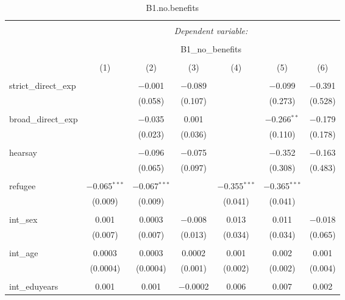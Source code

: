 
\begin{table}[H] \centering 
  \caption{B1.no.benefits} 
  \label{} 
\tiny 
\begin{tabular}{@{\extracolsep{4pt}}lcccccc} 
\\[-1.8ex]\hline 
\hline \\[-1.8ex] 
 & \multicolumn{6}{c}{\textit{Dependent variable:}} \\ 
\cline{2-7} 
\\[-1.8ex] & \multicolumn{6}{c}{B1\_no\_benefits} \\ 
\\[-1.8ex] & (1) & (2) & (3) & (4) & (5) & (6)\\ 
\hline \\[-1.8ex] 
 strict\_direct\_exp &  & $-$0.001 & $-$0.089 &  & $-$0.099 & $-$0.391 \\ 
  &  & (0.058) & (0.107) &  & (0.273) & (0.528) \\ 
  & & & & & & \\ 
 broad\_direct\_exp &  & $-$0.035 & 0.001 &  & $-$0.266$^{**}$ & $-$0.179 \\ 
  &  & (0.023) & (0.036) &  & (0.110) & (0.178) \\ 
  & & & & & & \\ 
 hearsay &  & $-$0.096 & $-$0.075 &  & $-$0.352 & $-$0.163 \\ 
  &  & (0.065) & (0.097) &  & (0.308) & (0.483) \\ 
  & & & & & & \\ 
 refugee & $-$0.065$^{***}$ & $-$0.067$^{***}$ &  & $-$0.355$^{***}$ & $-$0.365$^{***}$ &  \\ 
  & (0.009) & (0.009) &  & (0.041) & (0.041) &  \\ 
  & & & & & & \\ 
 int\_sex & 0.001 & 0.0003 & $-$0.008 & 0.013 & 0.011 & $-$0.018 \\ 
  & (0.007) & (0.007) & (0.013) & (0.034) & (0.034) & (0.065) \\ 
  & & & & & & \\ 
 int\_age & 0.0003 & 0.0003 & 0.0002 & 0.001 & 0.002 & 0.001 \\ 
  & (0.0004) & (0.0004) & (0.001) & (0.002) & (0.002) & (0.004) \\ 
  & & & & & & \\ 
 int\_eduyears & 0.001 & 0.001 & $-$0.0002 & 0.006 & 0.007 & 0.002 \\ 

\end{tabular}
\end{table}
